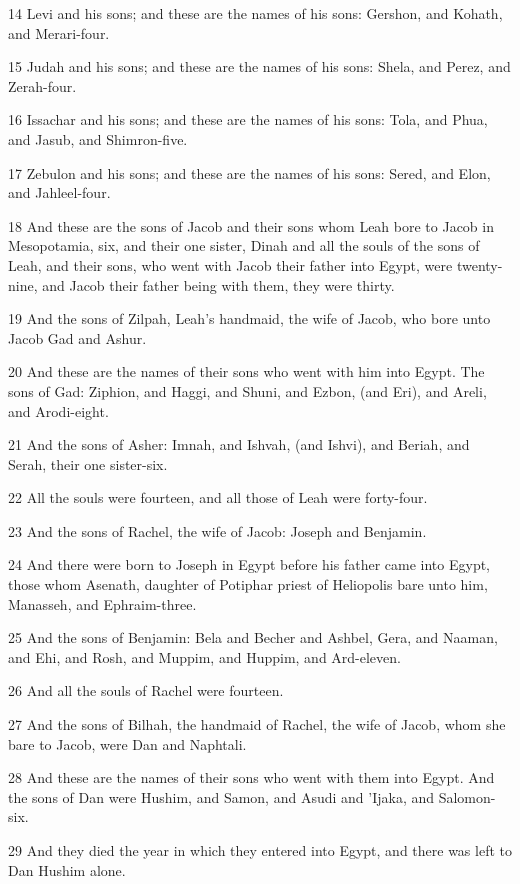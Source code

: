 \par 14 Levi and his sons; and these are the names of his sons: Gershon, and Kohath, and Merari-four.
\par 15 Judah and his sons; and these are the names of his sons: Shela, and Perez, and Zerah-four.
\par 16 Issachar and his sons; and these are the names of his sons: Tola, and Phua, and Jasub, and Shimron-five.
\par 17 Zebulon and his sons; and these are the names of his sons: Sered, and Elon, and Jahleel-four.
\par 18 And these are the sons of Jacob and their sons whom Leah bore to Jacob in Mesopotamia, six, and their one sister, Dinah and all the souls of the sons of Leah, and their sons, who went with Jacob their father into Egypt, were twenty-nine, and Jacob their father being with them, they were thirty.
\par 19 And the sons of Zilpah, Leah's handmaid, the wife of Jacob, who bore unto Jacob Gad and Ashur.
\par 20 And these are the names of their sons who went with him into Egypt. The sons of Gad: Ziphion, and Haggi, and Shuni, and Ezbon, (and Eri), and Areli, and Arodi-eight.
\par 21 And the sons of Asher: Imnah, and Ishvah, (and Ishvi), and Beriah, and Serah, their one sister-six.
\par 22 All the souls were fourteen, and all those of Leah were forty-four.
\par 23 And the sons of Rachel, the wife of Jacob: Joseph and Benjamin.
\par 24 And there were born to Joseph in Egypt before his father came into Egypt, those whom Asenath, daughter of Potiphar priest of Heliopolis bare unto him, Manasseh, and Ephraim-three.
\par 25 And the sons of Benjamin: Bela and Becher and Ashbel, Gera, and Naaman, and Ehi, and Rosh, and Muppim, and Huppim, and Ard-eleven.
\par 26 And all the souls of Rachel were fourteen.
\par 27 And the sons of Bilhah, the handmaid of Rachel, the wife of Jacob, whom she bare to Jacob, were Dan and Naphtali.
\par 28 And these are the names of their sons who went with them into Egypt. And the sons of Dan were Hushim, and Samon, and Asudi and 'Ijaka, and Salomon-six.
\par 29 And they died the year in which they entered into Egypt, and there was left to Dan Hushim alone.
